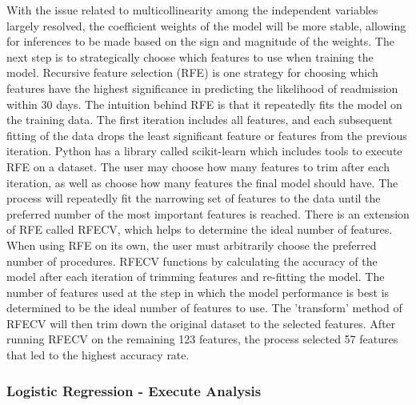 \documentclass[sigconf]{acmart}
\begin{document}
With the issue related to multicollinearity among the independent variables largely resolved, the coefficient weights of the model will be more stable, allowing for inferences to be made based on the sign and magnitude of the weights. The next step is to strategically choose which features to use when training the model. Recursive feature selection (RFE) is one strategy for choosing which features have the highest significance in predicting the likelihood of readmission within 30 days. The intuition behind RFE is that it repeatedly fits the model on the training data. The first iteration includes all features, and each subsequent fitting of the data drops the least significant feature or features from the previous iteration. Python has a library called scikit-learn which includes tools to execute RFE on a dataset. The user may choose how many features to trim after each iteration, as well as choose how many features the final model should have. The process will repeatedly fit the narrowing set of features to the data until the preferred number of the most important features is reached.
There is an extension of RFE called RFECV, which helps to determine the ideal number of features. When using RFE on its own, the user must arbitrarily choose the preferred number of procedures. RFECV functions by calculating the accuracy of the model after each iteration of trimming features and re-fitting the model. The number of features used at the step in which the model performance is best is determined to be the ideal number of features to use. The 'transform' method of RFECV will then trim down the original dataset to the selected features. After running RFECV on the remaining 123 features, the process selected 57 features that led to the highest accuracy rate. 

\subsubsection{Logistic Regression - Execute Analysis}
\end{document}
